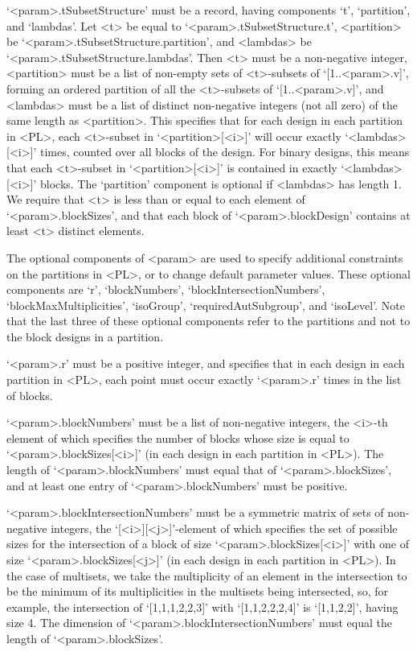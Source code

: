 `<param>.tSubsetStructure' must be a record, having
components `t', `partition', and `lambdas'. Let <t> be
equal to `<param>.tSubsetStructure.t', <partition> be
`<param>.tSubsetStructure.partition', and <lambdas> be
`<param>.tSubsetStructure.lambdas'.  Then <t> must be a non-negative
integer, <partition> must be a list of non-empty sets of <t>-subsets of
`[1..<param>.v]', forming an ordered partition of all the <t>-subsets of
`[1..<param>.v]', and <lambdas> must be a list of distinct non-negative
integers (not all zero) of the same length as <partition>. This specifies
that for each design in each partition in <PL>, each <t>-subset in
`<partition>[<i>]' will occur exactly `<lambdas>[<i>]' times, counted
over all blocks of the design.  For binary designs, this means that each
<t>-subset in `<partition>[<i>]' is contained in exactly `<lambdas>[<i>]'
blocks.  The `partition' component is optional if <lambdas> has length 1.
We require that <t> is less than or equal to each element of
`<param>.blockSizes', and that each block of `<param>.blockDesign'
contains at least <t> distinct elements.

The optional components of <param> are used to specify additional
constraints on the partitions in <PL>, or to change default
parameter values. These optional components are `r', `blockNumbers',
`blockIntersectionNumbers', `blockMaxMultiplicities', `isoGroup',
`requiredAutSubgroup', and `isoLevel'. Note that the last three of these
optional components refer to the partitions and not to the block designs
in a partition.

`<param>.r' must be a positive integer, and specifies that in each design
in each partition in <PL>, each point must occur exactly `<param>.r'
times in the list of blocks.

`<param>.blockNumbers' must be a list of non-negative integers, the <i>-th
element of which specifies the number of blocks whose size is equal to
`<param>.blockSizes[<i>]' (in each design in each partition in <PL>). The
length of `<param>.blockNumbers' must equal that of `<param>.blockSizes',
and at least one entry of `<param>.blockNumbers' must be positive.

`<param>.blockIntersectionNumbers' must be a symmetric matrix of sets
of non-negative integers, the `[<i>][<j>]'-element of which specifies
the set of possible sizes for the intersection of a block of size
`<param>.blockSizes[<i>]' with one of size `<param>.blockSizes[<j>]'
(in each design in each partition in <PL>). In the case of multisets, we
take the multiplicity of an element in the intersection to be the minimum
of its multiplicities in the multisets being intersected, so, for example,
the intersection of `[1,1,1,2,2,3]' with `[1,1,2,2,2,4]' is `[1,1,2,2]',
having size 4.  The dimension of `<param>.blockIntersectionNumbers'
must equal the length of `<param>.blockSizes'.

